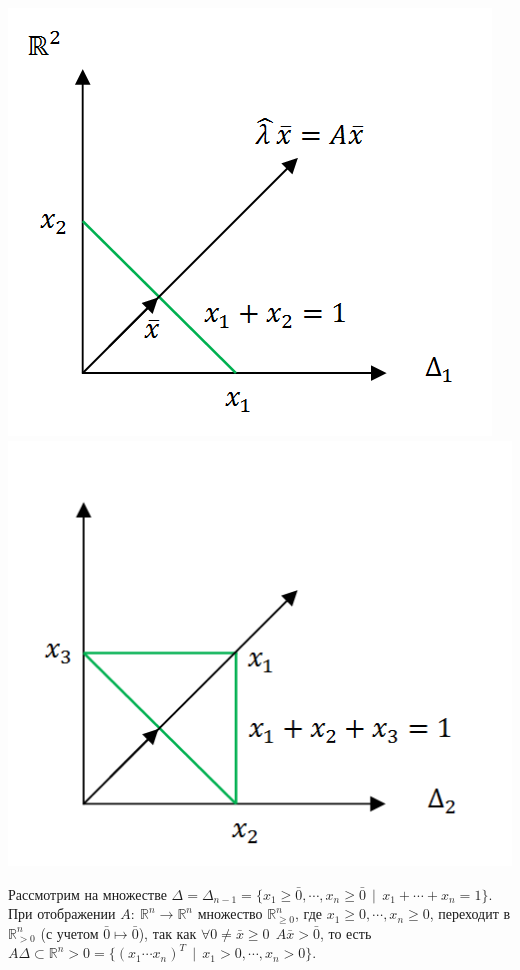 \documentclass[12pt]{article}
\theoremstyle{definition}
\numberwithin{equation}{section}
\begin{document}
\begin{center}
\includegraphics[scale=0.8]{l15_1.png}
\includegraphics[scale=0.8]{l15_2.png}\\
\end{center}
Рассмотрим на множестве $\Delta=\Delta_{n-1}=\{ x_1\geqslant \bar 0, \cdots, x_n\geqslant \bar 0 ~~|~~ x_1+\cdots +x_n=1 \}$.\\
При отображении $A:~\mathbb{R}^n\to \mathbb{R}^n$ множество $\mathbb{R}^n_{\geqslant 0}$, где $x_1\geqslant 0, \cdots, x_n\geqslant 0$, переходит в $\mathbb{R}^n_{>0}$ (с учетом $\bar 0 \mapsto \bar 0$), так как $\forall 0\neq \bar x \geqslant 0~~A\bar x>\bar 0$, то есть $A\Delta \subset \mathbb{R}^n>0=\{ (x_1 \cdots x_n)^T ~~|~~x_1>0, \cdots, x_n>0 \}$.
\end{document}
